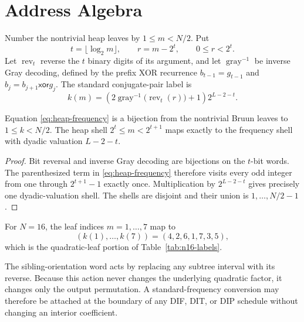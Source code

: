 \section{Address Algebra}
\label{app:address}

Number the nontrivial heap leaves by $1\le m<N/2$.  Put
\begin{equation}
 t=\lfloor\log_2m\rfloor,
 \qquad r=m-2^t,
 \qquad0\le r<2^t.
 \label{eq:heap-shell}
\end{equation}
Let $\operatorname{rev}_t$ reverse the $t$ binary digits of its argument, and
let $\operatorname{gray}^{-1}$ be inverse Gray decoding, defined by the prefix
XOR recurrence $b_{t-1}=g_{t-1}$ and
$b_j=b_{j+1}\mathbin{\mathsf{xor}}g_j$.  The standard conjugate-pair label is
\begin{equation}
 k(m)=\left(2\operatorname{gray}^{-1}
 \bigl(\operatorname{rev}_t(r)\bigr)+1\right)2^{L-2-t}.
 \label{eq:heap-frequency}
\end{equation}

\begin{theorem}
Equation \eqref{eq:heap-frequency} is a bijection from the nontrivial Bruun
leaves to $1\le k<N/2$.  The heap shell $2^t\le m<2^{t+1}$ maps exactly to the
frequency shell with dyadic valuation $L-2-t$.
\end{theorem}
\begin{proof}
Bit reversal and inverse Gray decoding are bijections on the $t$-bit words.
The parenthesized term in \eqref{eq:heap-frequency} therefore visits every odd
integer from one through $2^{t+1}-1$ exactly once.  Multiplication by
$2^{L-2-t}$ gives precisely one dyadic-valuation shell.  The shells are
disjoint and their union is $1,\ldots,N/2-1$.
\end{proof}

For $N=16$, the leaf indices $m=1,\ldots,7$ map to
\begin{equation}
 (k(1),\ldots,k(7))=(4,2,6,1,7,3,5),
\end{equation}
which is the quadratic-leaf portion of Table~\ref{tab:n16-labels}.

The sibling-orientation word acts by replacing any subtree interval with its
reverse.  Because this action never changes the underlying quadratic factor,
it changes only the output permutation.  A standard-frequency conversion may
therefore be attached at the boundary of any DIF, DIT, or DIP schedule without
changing an interior coefficient.
